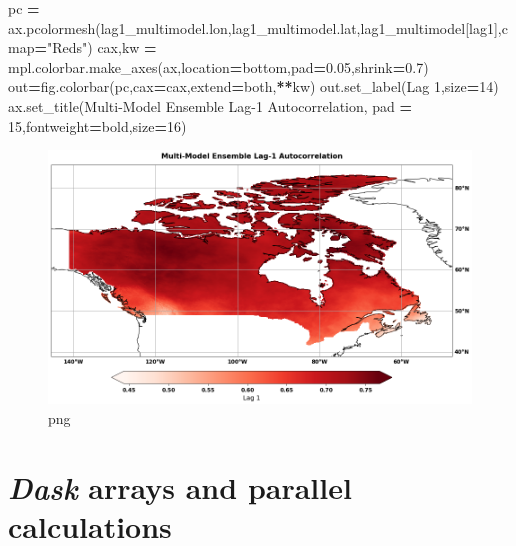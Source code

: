 \documentclass[
]{book}
\newenvironment{Shaded}{\begin{snugshade}}{\end{snugshade}}
\newcommand{\DecValTok}[1]{\textcolor[rgb]{0.00,0.00,0.81}{#1}}
\newcommand{\FloatTok}[1]{\textcolor[rgb]{0.00,0.00,0.81}{#1}}
\newcommand{\NormalTok}[1]{#1}
\newcommand{\OperatorTok}[1]{\textcolor[rgb]{0.81,0.36,0.00}{\textbf{#1}}}
\newcommand{\StringTok}[1]{\textcolor[rgb]{0.31,0.60,0.02}{#1}}
\begin{document}
\begin{Shaded}
\begin{Highlighting}[]
\NormalTok{pc }\OperatorTok{=}\NormalTok{ ax.pcolormesh(lag1\_multimodel.lon,lag1\_multimodel.lat,lag1\_multimodel[}\StringTok{\textquotesingle{}lag1\textquotesingle{}}\NormalTok{],cmap}\OperatorTok{=}\StringTok{"Reds"}\NormalTok{)}
\NormalTok{cax,kw }\OperatorTok{=}\NormalTok{ mpl.colorbar.make\_axes(ax,location}\OperatorTok{=}\StringTok{\textquotesingle{}bottom\textquotesingle{}}\NormalTok{,pad}\OperatorTok{=}\FloatTok{0.05}\NormalTok{,shrink}\OperatorTok{=}\FloatTok{0.7}\NormalTok{)}
\NormalTok{out}\OperatorTok{=}\NormalTok{fig.colorbar(pc,cax}\OperatorTok{=}\NormalTok{cax,extend}\OperatorTok{=}\StringTok{\textquotesingle{}both\textquotesingle{}}\NormalTok{,}\OperatorTok{**}\NormalTok{kw)}
\NormalTok{out.set\_label(}\StringTok{\textquotesingle{}Lag 1\textquotesingle{}}\NormalTok{,size}\OperatorTok{=}\DecValTok{14}\NormalTok{)}
\NormalTok{ax.set\_title(}\StringTok{\textquotesingle{}Multi{-}Model Ensemble Lag{-}1 Autocorrelation\textquotesingle{}}\NormalTok{, }
\NormalTok{             pad }\OperatorTok{=} \DecValTok{15}\NormalTok{,fontweight}\OperatorTok{=}\StringTok{\textquotesingle{}bold\textquotesingle{}}\NormalTok{,size}\OperatorTok{=}\DecValTok{16}\NormalTok{)}
\end{Highlighting}
\end{Shaded}

\begin{figure}
\centering
\includegraphics{output_16_1.png}
\caption{png}
\end{figure}

\hypertarget{dask-arrays-and-parallel-calculations}{%
\section{\texorpdfstring{\emph{Dask} arrays and parallel calculations}{Dask arrays and parallel calculations}}\label{dask-arrays-and-parallel-calculations}}
\end{document}
